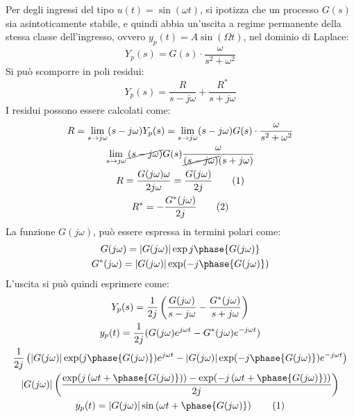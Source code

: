 \documentclass{article}
\numberwithin{equation}{subsection}
\newcommand{\tageq}{\tag{\stepcounter{equation}\theequation}}
\begin{document}
Per degli ingressi del tipo $u(t)=\sin(\omega t)$, si ipotizza che un processo $G(s)$ sia asintoticamente stabile, e quindi abbia un'uscita a regime permanente della stessa 
classe dell'ingresso, ovvero $y_p(t)=A\sin(\Omega t)$, nel dominio di Laplace: 
\begin{equation*}
    Y_p(s)=G(s)\cdot\displaystyle\frac{\omega}{s^2+\omega^2}
\end{equation*}    
Si può scomporre in poli residui: 
\begin{equation*}
    Y_p(s)=\displaystyle\frac{R}{s-j\omega}+\frac{R^*}{s+j\omega}
\end{equation*}    
I residui possono essere calcolati come: 
\begin{gather*}
    R=\lim_{s\to j\omega}(s-j\omega)Y_p(s)=\lim_{s\to j\omega}(s-j\omega)G(s)\cdot\displaystyle\frac{\omega}{s^2+\omega^2}\\
    \lim_{s\to j\omega}\cancel{(s-j\omega)}G(s)\displaystyle\frac{\omega}{\cancel{(s-j\omega)}(s+j\omega)}\\
    R=\displaystyle\frac{G(j\omega)\omega}{2j\omega}=\frac{G(j\omega)}{2j}\tageq\\
    R^*=-\frac{G^*(j\omega)}{2j}\tageq
\end{gather*}
La funzione $G(j\omega)$, può essere espressa in termini polari come:
\begin{gather}
    G(j\omega)=|G(j\omega)|\exp{{j\phase{G(j\omega)}}}\\
    G^*(j\omega)=|G(j\omega)|\exp({-j\phase{G(j\omega)}})
\end{gather}
L'uscita si può quindi esprimere come:
\begin{gather*}
    Y_p(s)=\displaystyle\frac{1}{2j}\left(\frac{G(j\omega)}{s-j\omega}-\frac{G^*(j\omega)}{s+j\omega}\right)\\
    y_p(t)=\displaystyle\frac{1}{2j}(G(j\omega)e^{j\omega t}-G^*(j\omega)e^{-j\omega t})\\
    \displaystyle\frac{1}{2j}\left(|G(j\omega)|\exp({j\phase{G(j\omega)}})e^{j\omega t}-|G(j\omega)|\exp({-j\phase{G(j\omega)}})e^{-j\omega t}\right)\\
    |G(j\omega)|\left(\displaystyle\frac{\exp({j\left(\omega t+\phase{G(j\omega)}\right)})-\exp({-j\left(\omega t+\phase{G(j\omega)}\right)})}{2j}\right)\\
    y_p(t)=|G(j\omega)|\sin\left(\omega t+\phase{G(j\omega)}\right)\tageq
\end{gather*}
\end{document}
